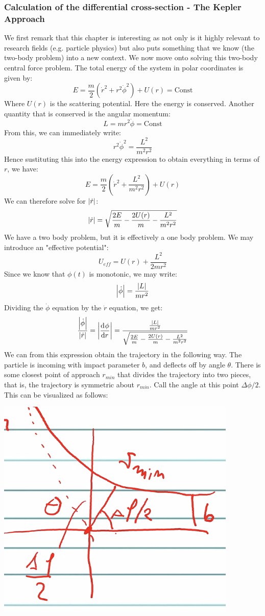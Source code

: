 \documentclass[../PHYS306Notes.tex]{subfiles}
\begin{document}
\subsubsection{Calculation of the differential cross-section - The Kepler Approach}
We first remark that this chapter is interesting as not only is it highly relevant to research fields (e.g. particle physics) but also puts something that we know (the two-body problem) into a new context. We now move onto solving this two-body central force problem. The total energy of the system in polar coordinates is given by:
\[E = \frac{m}{2}\left(\dot{r}^2 + r^2\dot{\phi}^2\right) + U(r) = \text{Const}\]
Where $U(r)$ is the scattering potential. Here the energy is conserved. Another quantity that is conserved is the angular momentum:
\[L = mr^2\dot{\phi} = \text{Const}\]
From this, we can immediately write:
\[r^2\dot{\phi}^2 = \frac{L^2}{m^2r^2}\]
Hence sustituting this into the energy expression to obtain everything in terms of $r$, we have:
\[E = \frac{m}{2}\left(\dot{r}^2 + \frac{L^2}{m^2r^2}\right) + U(r)\]
We can therefore solve for $\abs{\dot{r}}$:
\[\abs{\dot{r}} = \sqrt{\frac{2E}{m} - \frac{2U(r)}{m} - \frac{L^2}{m^2r^2}}\]
We have a two body problem, but it is effectively a one body problem. We may introduce an "effective potential":
\[U_{eff} = U(r) + \frac{L^2}{2mr^2}\]
Since we know that $\phi(t)$ is monotonic, we may write:
\[\abs{\dot{\phi}} = \frac{\abs{L}}{mr^2}\]
Dividing the $\dot{\phi}$ equation by the $\dot{r}$ equation, we get:
\[\frac{\abs{\dot{\phi}}}{\abs{\dot{r}}} = \abs{\dod{\phi}{r}} = \frac{\frac{\abs{L}}{mr^2}}{\sqrt{\frac{2E}{m} - \frac{2U(r)}{m} - \frac{L^2}{m^2r^2}}}\]
We can from this expression obtain the trajectory in the following way. The particle is incoming with impact parameter $b$, and deflects off by angle $\theta$. There is some closest point of approach $r_{min}$ that divides the trajectory into two pieces, that is, the trajectory is symmetric about $r_{min}$. Call the angle at this point $\Delta \phi/2$. This can be visualized as follows:
\begin{center}
    \includegraphics[scale=0.7]{Lecture-28/l28-img2.png}
\end{center}
\end{document}
